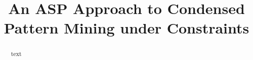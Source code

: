 

\usepackage[backend=bibtex, maxbibnames=99, minbibnames=99, sorting=none]{biblatex}

\renewcommand*{\bibfont}{\small}
\newcommand{\sergey}[1]{\textcolor{red}{sergey:#1}}
\newcommand{\rot}[1]{#1}

\title{An ASP Approach to Condensed Pattern Mining under Constraints}
\author{}
\institute{}


\maketitle
\begin{abstract}
  text
\end{abstract}

